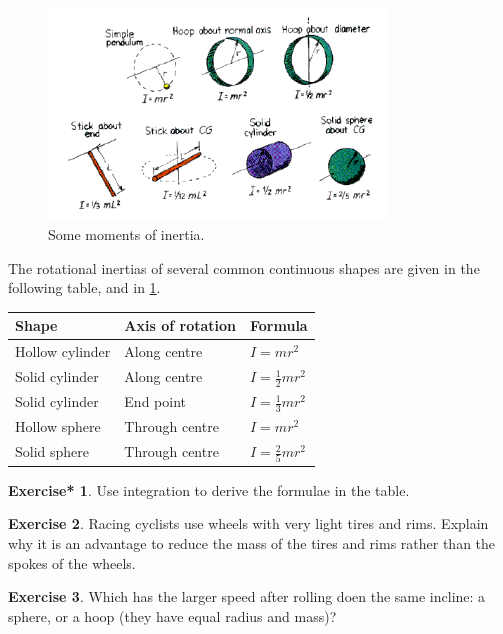 \documentclass[a4paper]{amsbook}
\theoremstyle{definition}
\newtheorem{exercise}{Exercise}
\numberwithin{exercise}{chapter}
\newtheorem{exercise*}[exercise]{Exercise*}
\numberwithin{exercise}{chapter}
\begin{document}
\begin{figure}
  \centering
  \includegraphics[width=0.8\textwidth]{inertiamoments}
  \caption{Some moments of inertia.\label{fig:inertias}}
\end{figure}

The rotational inertias of several common continuous shapes are given in the following table, and in \cref{fig:inertias}.
\begin{center}
  \def\arraystretch{1.5}
  \begin{tabular}{lll}\hline
    \textbf{Shape} & \textbf{Axis of rotation} & \textbf{Formula}\\\hline
    Hollow cylinder & Along centre & $ I = mr^2 $\\\hline
    Solid cylinder & Along centre & $ I = \frac{1}{2} mr^2 $\\\hline
    Solid cylinder & End point & $ I = \frac{1}{3} mr^2 $\\\hline
    Hollow sphere & Through centre & $ I = mr^2 $\\\hline
    Solid sphere & Through centre & $ I = \frac{2}{5} mr^2 $\\\hline
  \end{tabular}
\end{center}

\begin{exercise*}
  Use integration to derive the formulae in the table.
\end{exercise*}

\begin{exercise}
  Racing cyclists use wheels with very light tires and rims. Explain why it is an advantage to reduce the mass of
  the tires and rims rather than the spokes of the wheels.
\end{exercise}

\begin{exercise}
  Which has the larger speed after rolling doen the same incline: a sphere, or a hoop (they have equal radius and mass)?
\end{exercise}
\end{document}
